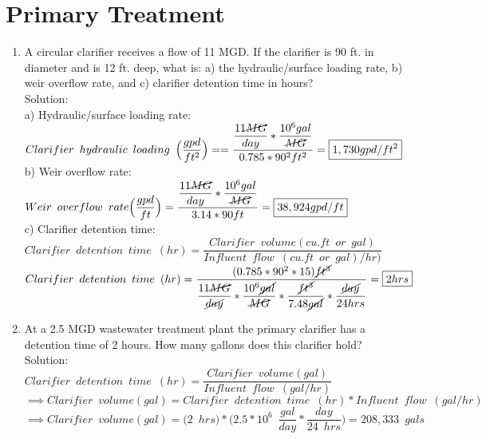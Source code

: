 \section{Primary Treatment} 
\begin{enumerate}
\item A circular clarifier receives a flow of 11 MGD.  If the clarifier is 90 ft. in diameter and is 12 ft. deep, what is: a) the hydraulic/surface loading rate, b) weir overflow rate, and c) clarifier detention time in hours?\\
Solution:\\
a) Hydraulic/surface loading rate:\\
$Clarifier \enspace hydraulic \enspace loading \enspace 	\Big(\dfrac{gpd}{ft^2}\Big) ==\dfrac{\dfrac{11\cancel{MG}}{{day}}*\dfrac{10^6gal}{\cancel{MG}}}{0.785*90^2 ft^2}=\boxed{1,730gpd/ft^2}$\\
b) Weir overflow rate:\\ 
$Weir \enspace overflow \enspace rate \Big(\dfrac{gpd}{ft}\Big) =\dfrac{\dfrac{11\cancel{MG}}{{day}}*\dfrac{10^6gal}{\cancel{MG}}}{3.14*90 ft}=\boxed{38,924gpd/ft}$\\
c) Clarifier detention time:\\
$Clarifier \enspace detention \enspace time \enspace (hr) = 	\dfrac{ Clarifier \enspace volume (cu.ft \enspace or \enspace gal)}{Influent \enspace flow \enspace (cu.ft \enspace or \enspace gal)/hr)}$\\
$Clarifier \enspace detention \enspace time \enspace (hr) = 	\dfrac{(0.785*90^2*15)\cancel{ft^3}}{\dfrac{11\cancel{MG}}{\cancel{day}}*\dfrac{10^6\cancel{gal}}{\cancel{MG}}*\dfrac{\cancel{ft^3}}{7.48\cancel{gal}}*\dfrac{\cancel{day}}{24hrs}}=\boxed{2hrs}$\\

\item At a 2.5 MGD wastewater treatment plant the primary clarifier has a detention time of 2 hours. How many gallons does this clarifier hold?\\

Solution:\\
\vspace{0.2cm}
$Clarifier \enspace detention \enspace time \enspace (hr) = 	\dfrac{ Clarifier \enspace volume (gal)}{Influent \enspace flow \enspace (gal/hr)}$\\
\vspace{0.2cm}
$ \implies Clarifier \enspace volume (gal)=Clarifier \enspace detention \enspace time \enspace (hr)*Influent \enspace flow \enspace (gal/hr)$\\
\vspace{0.2cm}
$ \implies Clarifier \enspace volume (gal)= \Big(2 \enspace hrs\Big)*\Big(2.5*10^6 \enspace \dfrac{gal}{day}*\dfrac{day}{24 \enspace hrs}\Big)=\boxed{208,333 \enspace gals}$\\

\end{enumerate}
